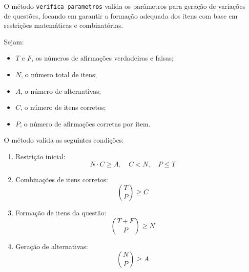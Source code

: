 O método \texttt{verifica\_parametros} valida os parâmetros para geração de variações de questões, focando em garantir a formação adequada dos itens com base em restrições matemáticas e combinatórias.

Sejam:
\begin{itemize}
    \item $T$ e $F$, os números de afirmações verdadeiras e falsas;
    \item $N$, o número total de itens;
    \item $A$, o número de alternativas;
    \item $C$, o número de itens corretos;
    \item $P$, o número de afirmações corretas por item.
\end{itemize}

O método valida as seguintes condições:
\begin{enumerate}
    \item Restrição inicial:
    \begin{equation}
        N \cdot C \geq A, \quad C < N, \quad P \leq T
    \end{equation}
    \item Combinações de itens corretos:
    \begin{equation}
        \binom{T}{P} \geq C
    \end{equation}
    \item Formação de itens da questão:
    \begin{equation}
        \binom{T+F}{P} \geq N
    \end{equation}
    \item Geração de alternativas:
    \begin{equation}
        \binom{N}{P} \geq A
    \end{equation}
\end{enumerate}
    


